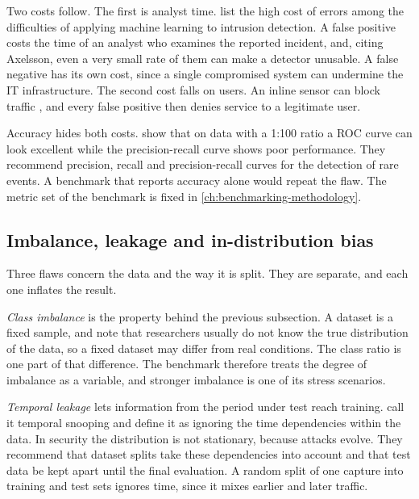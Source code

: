 Two costs follow. The first is analyst time. \citet{sommer2010outside} list
the high cost of errors among the difficulties of applying machine learning
to intrusion detection. A false positive costs the time of an analyst who
examines the reported incident, and, citing Axelsson, even a very small rate
of them can make a detector unusable. A false negative has its own cost,
since a single compromised system can undermine the IT infrastructure. The
second cost falls on users. An inline sensor can block traffic
\citep{scarfone2007nist80094}, and every false positive then denies service
to a legitimate user.

Accuracy hides both costs. \citet{arp2022dosdonts} show that on data with a
1:100 ratio a ROC curve can look excellent while the precision-recall curve
shows poor performance. They recommend precision, recall and precision-recall
curves for the detection of rare events. A benchmark that reports accuracy
alone would repeat the flaw. The metric set of the benchmark is fixed in
\cref{ch:benchmarking-methodology}.

\subsection{Imbalance, leakage and in-distribution bias}
\label{sec:imbalance-leakage-bias}

Three flaws concern the data and the way it is split. They are separate, and
each one inflates the result.

\emph{Class imbalance} is the property behind the previous subsection. A
dataset is a fixed sample, and \citet{arp2022dosdonts} note that researchers
usually do not know the true distribution of the data, so a fixed dataset may
differ from real conditions. The class ratio is one part of that difference.
The benchmark therefore treats the degree of imbalance as a variable, and
stronger imbalance is one of its stress scenarios.

\emph{Temporal leakage} lets information from the period under test reach
training. \citet{arp2022dosdonts} call it temporal snooping and define it as
ignoring the time dependencies within the data. In security the distribution
is not stationary, because attacks evolve. They recommend that dataset splits
take these dependencies into account and that test data be kept apart until
the final evaluation. A random split of one capture into training and test
sets ignores time, since it mixes earlier and later traffic.

